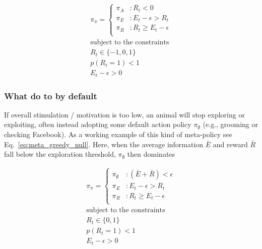 \documentclass[9pt,twocolumn,twoside]{pnas-new}
\begin{document}
\begin{equation} \label{eq:meta_greedy_aver}
    \begin{split}
        \pi_{\pi} = 
        \begin{cases}
            \pi_A & : R_t < 0 \\
            \pi_E & : E_t - \epsilon > R_t \\
            \pi_R & : R_t \geq E_t - \epsilon \\
        \end{cases}\\
        \text{subject to the constraints}\\
        R_t \in \{-1, 0, 1\}\\ 
        p(R_t = 1) < 1\\
        E_t - \epsilon > 0
    \end{split}
\end{equation}


\subsubsection*{What do to by default}
If overall stimulation / motivation is too low, an animal will stop exploring or exploiting, often instead adopting some default action policy $\pi_{\emptyset}$ (e.g., grooming or checking Facebook). As a working example of this kind of meta-policy see Eq.~\ref{eq:meta_greedy_null}. Here, when the average information $\bar E$ and reward $\bar R$ fall below the exploration threshold, $\pi_{\emptyset}$ then dominates 

\begin{equation} \label{eq:meta_greedy_null}
    \begin{split}
        \pi_{\pi} = 
        \begin{cases}
            \pi_{\emptyset} & : (\bar E + \bar R) < \epsilon \\
            \pi_E & : E_t - \epsilon > R_t \\
            \pi_R & : R_t \geq E_t - \epsilon \\
        \end{cases}\\
        \text{subject to the constraints}\\
        R_t \in \{0, 1\}\\ 
        p(R_t = 1) < 1\\
        E_t - \epsilon > 0
    \end{split}
\end{equation}
\end{document}
